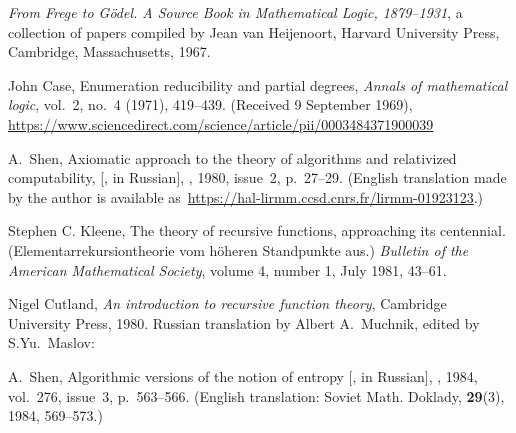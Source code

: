\documentclass[12pt]{article}
\theoremstyle{remark}
\newcommand{\bibquote}[1]{}
\newcommand{\nb}[1]{{\color{red}}}
\begin{document}
\begin{thebibliography}{99}
\emph{From Frege to G\"odel. A Source Book in Mathematical Logic, 1879--1931}, a collection of papers compiled by Jean van Heijenoort,  Harvard University Press, Cambridge, Massachusetts, 1967. 


John Case, Enumeration reducibility and partial degrees, \emph{Annals of mathematical logic}, vol.~2, no.~4 (1971), 419--439. (Received 9 September 1969), \url{https://www.sciencedirect.com/science/article/pii/0003484371900039}

A.~Shen, Axiomatic approach to the theory of algorithms and relativized computability,
[, in Russian], \emph{}, 1980, issue~2, p.~27--29. (English translation made by the author is available as~\url{https://hal-lirmm.ccsd.cnrs.fr/lirmm-01923123}.)

Stephen C. Kleene, The theory of recursive functions, approaching its centennial. (Elementarrekursiontheorie vom h\"oheren Standpunkte aus.) \emph{Bulletin of the American Mathematical Society}, volume 4, number 1, July 1981, 43--61.

\bibquote{\nb{\rus{название primitive recursion, утверждает Клини, введено Петер в 1934 году, до этого говорили просто о рекурсивных функциях, начиная с Гёделя в 1931 году. Термин <<рекурсия>> (но не <<рекурсивные функции>>) есть у Сколема в 1923 и Гильберта в 1926.}}}

Nigel Cutland, \emph{An introduction to recursive function theory}, Cambridge University Press, 1980. Russian translation by Albert A.~Muchnik, edited by S.Yu.~Maslov: 

\bibquote{\nb{\rus{Частично рекурсивные функции определяеются (глава 3, раздел 2) с помощью рекурсии, подстановки и минимизации, но даётся ссылка на Гёделя и Клини 1936, впрочем, без указания конкретной работы. Теорема Майхилла -- Шепердсона, глава 10, параграф 2, теорема Райса -- Шапиро, глава 7, параграф 2}}}

A.~Shen, Algorithmic versions of the notion of entropy [, in Russian], \emph{}, 1984, vol.~276, issue~3, p.~563--566. (English translation: Soviet Math. Doklady, \textbf{29}(3), 1984, 569--573.)


\end{thebibliography}
\end{document}
